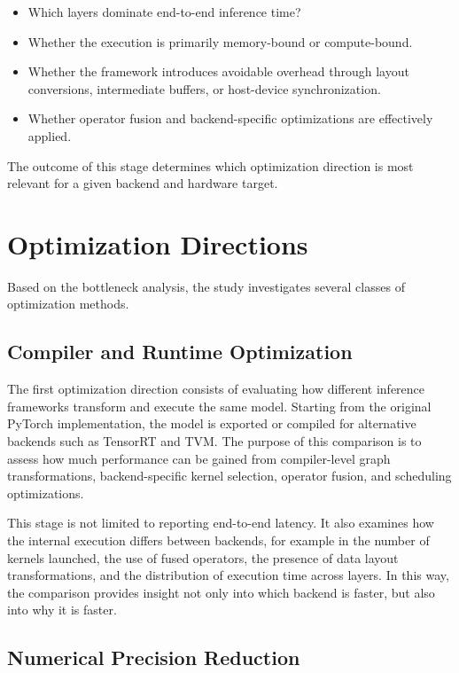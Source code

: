 \documentclass[12pt,a4paper]{report}
\begin{document}
\begin{itemize}
    \item Which layers dominate end-to-end inference time?
    \item Whether the execution is primarily memory-bound or compute-bound.
    \item Whether the framework introduces avoidable overhead through layout conversions, intermediate buffers, or
    host-device synchronization.
    \item Whether operator fusion and backend-specific optimizations are effectively applied.
\end{itemize}

The outcome of this stage determines which optimization direction is most relevant for a given backend and hardware target.

\section{Optimization Directions}

Based on the bottleneck analysis, the study investigates several classes of optimization methods.

\subsection{Compiler and Runtime Optimization}

The first optimization direction consists of evaluating how different inference frameworks transform and execute the
same model. Starting from the original PyTorch implementation, the model is exported or compiled for alternative
backends such as TensorRT and TVM. The purpose of this comparison is to assess how much performance can be gained
from compiler-level graph transformations, backend-specific kernel selection, operator fusion, and scheduling
optimizations.

This stage is not limited to reporting end-to-end latency. It also examines how the internal execution differs between
backends, for example in the number of kernels launched, the use of fused operators, the presence of data layout
transformations, and the distribution of execution time across layers. In this way, the comparison provides insight
not only into which backend is faster, but also into why it is faster.

\subsection{Numerical Precision Reduction}
\end{document}

